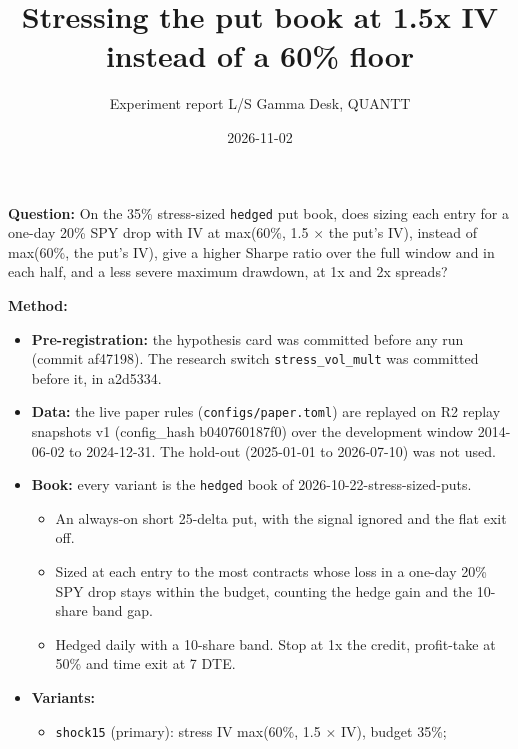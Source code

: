 \documentclass{article}
\title{Stressing the put book at 1.5x IV instead of a 60\% floor}
\author{Experiment report \textperiodcentered{} L/S Gamma Desk, QUANTT}
\date{2026-11-02}
\begin{document}
\maketitle

\textbf{Question:} On the 35\% stress-sized \texttt{hedged} put book, does sizing each entry for a one-day 20\% SPY drop with IV at max(60\%, 1.5 \ensuremath{\times} the put's IV), instead of max(60\%, the put's IV), give a higher Sharpe ratio over the full window and in each half, and a less severe maximum drawdown, at 1x and 2x spreads?

\textbf{Method:}

\begin{itemize}

\item \textbf{Pre-registration:} the hypothesis card was committed before any run (commit af47198). The research switch \texttt{stress\_\allowbreak{}vol\_\allowbreak{}mult} was committed before it, in a2d5334.

\item \textbf{Data:} the live paper rules (\texttt{configs/\allowbreak{}paper.\allowbreak{}toml}) are replayed on R2 replay snapshots v1 (config\_hash b040760187f0) over the development window 2014-06-02 to 2024-12-31. The hold-out (2025-01-01 to 2026-07-10) was not used.

\item \textbf{Book:} every variant is the \texttt{hedged} book of 2026-10-22-stress-sized-puts.

\begin{itemize}

\item An always-on short 25-delta put, with the signal ignored and the flat exit off.

\item Sized at each entry to the most contracts whose loss in a one-day 20\% SPY drop stays within the budget, counting the hedge gain and the 10-share band gap.

\item Hedged daily with a 10-share band. Stop at 1x the credit, profit-take at 50\% and time exit at 7 DTE.

\end{itemize}

\item \textbf{Variants:}

\begin{itemize}

\item \texttt{shock15} (primary): stress IV max(60\%, 1.5 \ensuremath{\times} IV), budget 35\%;


\end{itemize}
\end{itemize}
\end{document}
